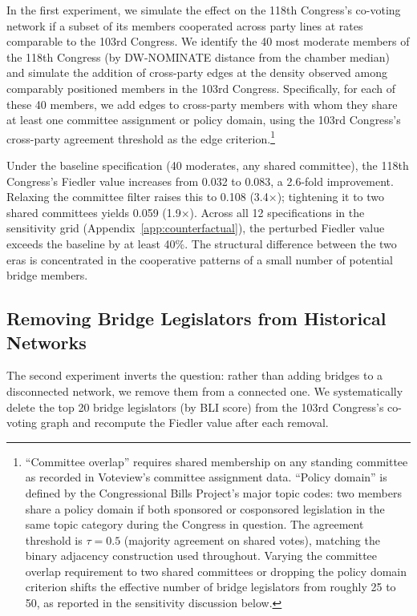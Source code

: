 \documentclass[12pt, a4paper]{article}
\begin{document}
In the first experiment, we simulate the effect on the 118th Congress's co-voting network if a subset of its members cooperated across party lines at rates comparable to the 103rd Congress. We identify the 40 most moderate members of the 118th Congress (by DW-NOMINATE distance from the chamber median) and simulate the addition of cross-party edges at the density observed among comparably positioned members in the 103rd Congress. Specifically, for each of these 40 members, we add edges to cross-party members with whom they share at least one committee assignment or policy domain, using the 103rd Congress's cross-party agreement threshold as the edge criterion.\footnote{``Committee overlap'' requires shared membership on any standing committee as recorded in Voteview's committee assignment data. ``Policy domain'' is defined by the Congressional Bills Project's major topic codes: two members share a policy domain if both sponsored or cosponsored legislation in the same topic category during the Congress in question. The agreement threshold is $\tau = 0.5$ (majority agreement on shared votes), matching the binary adjacency construction used throughout. Varying the committee overlap requirement to two shared committees or dropping the policy domain criterion shifts the effective number of bridge legislators from roughly 25 to 50, as reported in the sensitivity discussion below.}

Under the baseline specification (40 moderates, any shared committee), the 118th Congress's Fiedler value increases from 0.032 to 0.083, a 2.6-fold improvement. Relaxing the committee filter raises this to 0.108 (3.4$\times$); tightening it to two shared committees yields 0.059 (1.9$\times$). Across all 12 specifications in the sensitivity grid (Appendix~\ref{app:counterfactual}), the perturbed Fiedler value exceeds the baseline by at least 40\%. The structural difference between the two eras is concentrated in the cooperative patterns of a small number of potential bridge members.

\subsection{Removing Bridge Legislators from Historical Networks}

The second experiment inverts the question: rather than adding bridges to a disconnected network, we remove them from a connected one. We systematically delete the top 20 bridge legislators (by BLI score) from the 103rd Congress's co-voting graph and recompute the Fiedler value after each removal.
\end{document}
